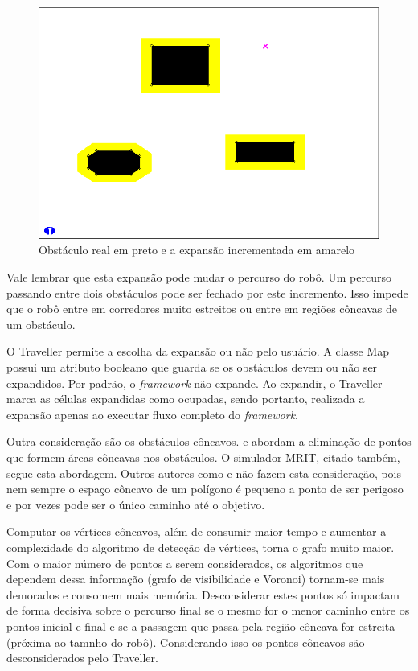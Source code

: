 \begin{figure}[h]
	\centering
	\label{fig34}
		\includegraphics[keepaspectratio=true,scale=0.5]{figuras/expansao.png}
	\caption{Obstáculo real em preto e a expansão incrementada em amarelo \cite{MRIT_SITE}}
\end{figure}

Vale lembrar que esta expansão pode mudar o percurso do robô. Um percurso passando entre dois obstáculos pode ser fechado por este incremento. Isso impede que o robô entre em corredores muito estreitos ou entre em regiões côncavas de um obstáculo.

O Traveller permite a escolha da expansão ou não pelo usuário. A classe Map possui um atributo booleano que guarda se os obstáculos devem ou não ser expandidos. Por padrão, o \textit{framework} não expande. Ao expandir, o Traveller marca as células expandidas como ocupadas, sendo portanto, realizada a expansão apenas ao executar fluxo completo do \textit{framework}.

Outra consideração são os obstáculos côncavos. \cite{Siegwart2004} e \cite{Guzman2008} abordam a eliminação de pontos que formem áreas côncavas nos obstáculos. O simulador MRIT, citado também, segue esta abordagem. Outros autores como \cite{Thomsen2010} e \cite{Choset2005} não fazem esta consideração, pois nem sempre o espaço côncavo de um polígono é pequeno a ponto de ser perigoso e por vezes pode ser o único caminho até o objetivo. 

Computar os vértices côncavos, além de consumir maior tempo e aumentar a complexidade do algoritmo de detecção de vértices, torna o grafo muito maior. Com o maior número de pontos a serem considerados, os algoritmos que dependem dessa informação (grafo de visibilidade e Voronoi) tornam-se mais demorados e consomem mais memória. Desconsiderar estes pontos só impactam de forma decisiva sobre o percurso final se o mesmo for o menor caminho entre os pontos inicial e final e se a passagem que passa pela região côncava for estreita (próxima ao tamnho do robô). Considerando isso os pontos côncavos são desconsiderados pelo Traveller.

